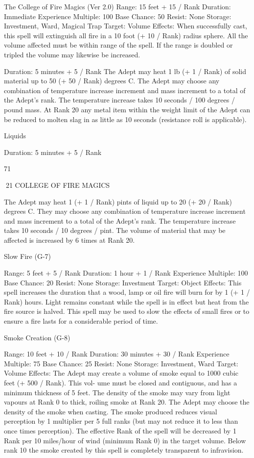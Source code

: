 \begin{Chapter}{The College of Fire Magics (Ver 2.0)}
Range: 15 feet + 15 / Rank 
Duration: Immediate 
Experience Multiple: 100 
Base Chance: 50%
Resist: None 
Storage: Investment, Ward, Magical Trap 
Target: Volume 
Effects:  When  successfully  cast,  this  spell  will 
extinguish all fire in a 10 foot (+ 10 / Rank) radius 
sphere.  All  the  volume  affected  must  be  within 
range of the spell. If the range is doubled or tripled 
the volume may likewise be increased. 

Duration: 5 minutes + 5 / Rank 
The  Adept  may  heat  1  lb  (+  1  /  Rank)  of  solid 
material  up  to  50  (+  50  /  Rank)  degrees  C.  The 
Adept may choose any combination of temperature 
increase increment and mass increment to a total of 
the  Adept’s  rank.  The  temperature  increase  takes 
10 seconds / 100 degrees / pound mass. At Rank 20 
any metal item within the weight limit of the Adept 
can  be  reduced  to  molten  slag  in  as  little  as  10 
seconds (resistance roll is applicable). 

Liquids 

Duration: 5 minutes + 5 / Rank 

71 

21 COLLEGE OF FIRE MAGICS 

The Adept may heat 1 (+ 1 / Rank) pints of liquid 
up  to  20  (+  20  /  Rank)  degrees  C.  They  may 
choose  any  combination  of  temperature  increase 
increment  and  mass  increment  to  a  total  of  the 
Adept’s  rank.  The  temperature  increase  takes  10 
seconds / 10 degrees / pint. The volume of material 
that  may  be  affected  is  increased  by  6  times  at 
Rank 20. 

Slow Fire (G-7) 

Range: 5 feet + 5 / Rank 
Duration: 1 hour + 1 / Rank 
Experience Multiple: 100 
Base Chance: 20%
Resist: None 
Storage: Investment 
Target: Object 
Effects:  This  spell  increases  the  duration  that  a 
wood,  lamp  or  oil  fire  will  burn  for  by  1  (+  1  / 
Rank) hours. Light remains constant while the spell 
is in effect but heat from the fire source is halved. 
This spell may be used to slow the effects of small 
fires  or  to  ensure  a  fire  lasts  for  a  considerable 
period of time. 

Smoke Creation (G-8) 

Range: 10 feet + 10 / Rank 
Duration: 30 minutes + 30 / Rank 
Experience Multiple: 75 
Base Chance: 25%
Resist: None 
Storage: Investment, Ward 
Target: Volume 
Effects: The Adept may create a volume of smoke 
equal to 1000 cubic feet (+ 500 / Rank). This vol-
ume  must  be  closed  and  contiguous,  and  has  a 
minimum  thickness  of  5  feet.  The  density  of  the 
smoke  may  vary  from  light  vapours  at  Rank  0  to 
thick,  roiling  smoke  at  Rank  20.  The  Adept  may 
choose the density of the smoke when casting. The 
smoke  produced  reduces  visual  perception  by  1 
multiplier per 5 full ranks (but may not reduce it to 
less  than  once  times  perception).  The  effective 
Rank of the spell will be decreased by 1 Rank per 
10  miles/hour  of  wind  (minimum  Rank  0)  in  the 
target volume. Below rank 10 the smoke created by 
this spell is completely transparent to infravision. 


\end{Chapter}
